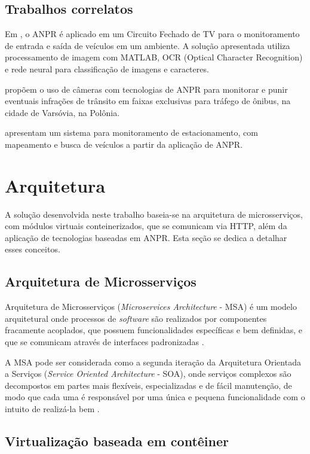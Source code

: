 \documentclass[12pt]{article}
\begin{document}
\subsection{Trabalhos correlatos}

Em , o ANPR é aplicado em um Circuito Fechado de TV para o monitoramento de entrada e saída de veículos em um ambiente. A solução apresentada utiliza processamento de imagem com MATLAB, OCR (Optical Character Recognition) e rede neural para classificação de imagens e caracteres.

 propõem o uso de câmeras com tecnologias de ANPR para monitorar e punir eventuais infrações de trânsito em faixas exclusivas para tráfego de ônibus, na cidade de Varsóvia, na Polônia.

 apresentam um sistema para monitoramento de estacionamento, com mapeamento e busca de veículos a partir da aplicação de ANPR.

\section{Arquitetura} \label{sec:architecture}

A solução desenvolvida neste trabalho baseia-se na arquitetura de microsserviços, com módulos virtuais conteinerizados, que se comunicam via HTTP, além da aplicação de tecnologias baseadas em ANPR. Esta seção se dedica a detalhar esses conceitos.

\subsection{Arquitetura de Microsserviços}

Arquitetura de Microsserviços (\textit{Microservices Architecture} - MSA) é um modelo arquitetural onde processos de \textit{software} são realizados por componentes fracamente acoplados, que possuem funcionalidades específicas e bem definidas, e que se comunicam através de interfaces padronizadas \cite{viggiato2018}.

A MSA pode ser considerada como a segunda iteração da Arquitetura Orientada a Serviços (\textit{Service Oriented Architecture} - SOA), onde serviços complexos são decompostos em partes mais flexíveis, especializadas e de fácil manutenção, de modo que cada uma é responsável por uma única e pequena funcionalidade com o intuito de realizá-la bem \cite{homay2019}. 

\subsection{Virtualização baseada em contêiner}
\end{document}
